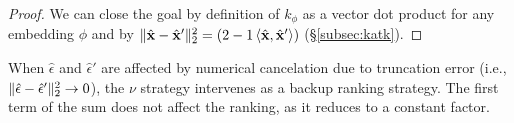\begin{proof} We can close the goal by definition of $k_{\phi}$ as a vector dot product for any embedding $\phi$ and by  $\|\hat{\mathbf{x}}-\hat{\mathbf{x}}'\|_2^2=(2-1\braket{\hat{\mathbf{x}},\hat{\mathbf{x}}'})$ (\S\ref{subsec:katk}).	
%	
\end{proof}
%
When $\hat{\epsilon}$ and $\hat{\epsilon}'$ are affected by numerical cancelation due to truncation error (i.e., $\|\hat{\epsilon}-\hat{\epsilon}'\|_{2}^2\to 0$), the $\nu$ strategy intervenes as a backup ranking strategy. The first term of the sum does not affect the ranking, as it reduces to a constant factor.

%





